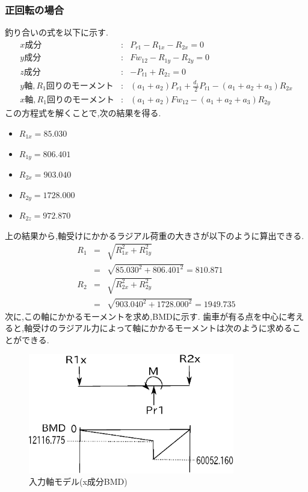 \documentclass[a4j,twoside,openright,11pt]{jreport}
\begin{document}
\subsubsection{正回転の場合}
釣り合いの式を以下に示す.
\begin{eqnarray}
x成分&:&P_{r1}-R_{1x}-R_{2x}=0\\
y成分&:&Fw_{12}-R_{1y}-R_{2y}=0\\
z成分&:&-P_{t1}+R_{2z}=0\\
y軸,R_1回りのモーメント&:&(a_1+a_2)P_{r1}+\frac{d_1}{2}P_{t1}-(a_1+a_2+a_3)R_{2x}\\
x軸,R_1回りのモーメント&:&(a_1+a_2)Fw_{12}-(a_1+a_2+a_3)R_{2y}
\end{eqnarray}
この方程式を解くことで,次の結果を得る.
\begin{itemize}
\item $R_{1x}=85.030$
\item $R_{1y}=806.401$
\item $R_{2x}=903.040$
\item $R_{2y}=1728.000$
\item $R_{2z}=972.870$
\end{itemize}
上の結果から,軸受けにかかるラジアル荷重の大きさが以下のように算出できる.
\begin{eqnarray}
R_1 &=& \sqrt {R_{1x}^2+R_{1y}^2}\\
    &=& \sqrt {85.030^2+806.401^2}=810.871\\
R_2 &=& \sqrt {R_{2x}^2+R_{2y}^2}\\
    &=& \sqrt {903.040^2+1728.000^2}=1949.735
\end{eqnarray}
次に,この軸にかかるモーメントを求め,BMDに示す.
歯車が有る点を中心に考えると,軸受けのラジアル力によって軸にかかるモーメントは次のように求めることができる.
\begin{figure}[htbp]
\begin{center}
\includegraphics[width=9cm]{jiku14.eps}
\end{center}
\caption{入力軸モデル(x成分BMD)}
\end{figure}
\end{document}

